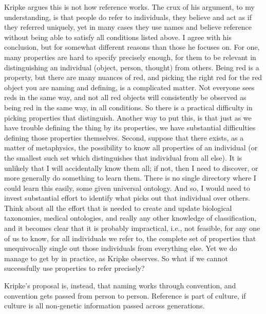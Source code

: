 \documentclass[graybox,envcountchap,sectrefs]{svmono}
\begin{document}
Kripke argues this is not how reference works. The crux of his argument, to my understanding, is that people do refer to individuals, they believe and act as if they referred uniquely, yet in many cases they use names and believe reference without being able to satisfy all conditions listed above. I agree with his conclusion, but for somewhat different reasons than those he focuses on. For one, many properties are hard to specify precisely enough, for them to be relevant in distinguishing an individual (object, person, thought) from others. Being red is a property, but there are many nuances of red, and picking the right red for the red object you are naming and defining, is a complicated matter. Not everyone sees reds in the same way, and not all red objects will consistently be observed as being red in the same way, in all conditions. So there is a practical difficulty in picking properties that distinguish. Another way to put this, is that just as we have trouble defining the thing by its properties, we have substantial difficulties defining those properties themselves. Second, suppose that there exists, as a matter of metaphysics, the possibility to know all properties of an individual (or the smallest such set which distinguishes that individual from all else). It is unlikely that I will accidentally know them all; if not, then I need to discover, or more generally do something to learn them. There is no single directory where I could learn this easily, some given universal ontology. And so, I would need to invest substantial effort to identify what picks out that individual over others. Think about all the effort that is needed to create and update biological taxonomies, medical ontologies, and really any other knowledge of classification, and it becomes clear that it is probably impractical, i.e., not feasible, for any one of us to know, for all individuals we refer to, the complete set of properties that unequivocally single out those individuals from everything else. Yet we do manage to get by in practice, as Kripke observes. So what if we cannot successfully use properties to refer precisely?

Kripke's proposal is, instead, that naming works through convention, and convention gets passed from person to person. Reference is part of culture, if culture is all non-genetic information passed across generations.
\end{document}
